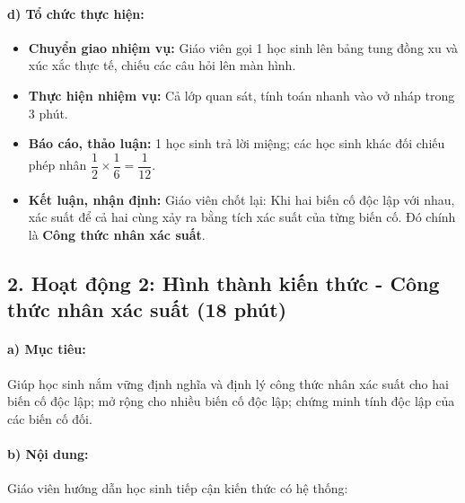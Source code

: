 \documentclass[12pt, a4paper]{article}
\begin{document}
\paragraph{d) Tổ chức thực hiện:}
\begin{itemize}[leftmargin=0.8cm]
    \item \textbf{Chuyển giao nhiệm vụ:} Giáo viên gọi 1 học sinh lên bảng tung đồng xu và xúc xắc thực tế, chiếu các câu hỏi lên màn hình.
    \item \textbf{Thực hiện nhiệm vụ:} Cả lớp quan sát, tính toán nhanh vào vở nháp trong 3 phút.
    \item \textbf{Báo cáo, thảo luận:} 1 học sinh trả lời miệng; các học sinh khác đối chiếu phép nhân $\dfrac{1}{2} \times \dfrac{1}{6} = \dfrac{1}{12}$.
    \item \textbf{Kết luận, nhận định:} Giáo viên chốt lại: Khi hai biến cố độc lập với nhau, xác suất để cả hai cùng xảy ra bằng tích xác suất của từng biến cố. Đó chính là \textbf{Công thức nhân xác suất}.
\end{itemize}

\subsection*{2. Hoạt động 2: Hình thành kiến thức - Công thức nhân xác suất (18 phút)}

\paragraph{a) Mục tiêu:} Giúp học sinh nắm vững định nghĩa và định lý công thức nhân xác suất cho hai biến cố độc lập; mở rộng cho nhiều biến cố độc lập; chứng minh tính độc lập của các biến cố đối.

\paragraph{b) Nội dung:} Giáo viên hướng dẫn học sinh tiếp cận kiến thức có hệ thống:
\end{document}
